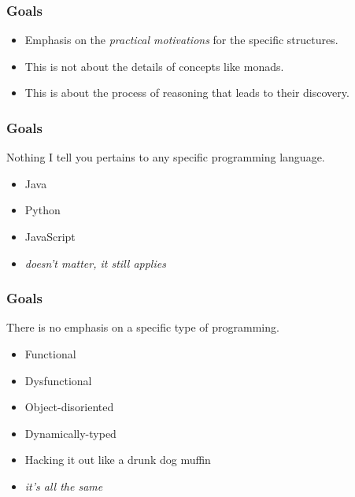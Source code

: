 \begin{frame}
\frametitle{Goals}
\begin{itemize}
\item<1-> Emphasis on the \emph{practical motivations} for the specific structures.
\item<2-> This is not about the details of concepts like monads.
\item<3-> This is about the process of reasoning that leads to their discovery.
\end{itemize}
\end{frame}

\begin{frame}
\frametitle{Goals}
\begin{block}{Nothing I tell you pertains to any specific programming language.}
\begin{itemize}
\item Java
\item Python
\item JavaScript
\item \emph{doesn't matter, it still applies}
\end{itemize}
\end{block}
\end{frame}

\begin{frame}
\frametitle{Goals}
\begin{block}{There is no emphasis on a specific type of programming.}
\begin{itemize}
\item Functional
\item Dysfunctional
\item Object-disoriented
\item Dynamically-typed
\item Hacking it out like a drunk dog muffin
\item \emph{it's all the same}
\end{itemize}
\end{block}
\end{frame}
